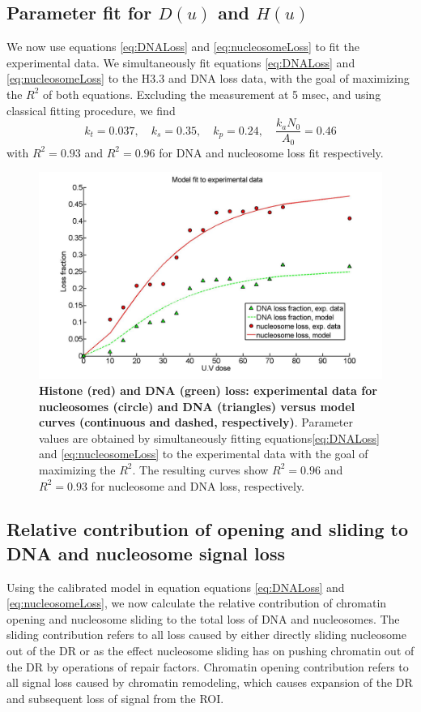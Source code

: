 \documentclass[12pt]{article}
\begin{document}
	\subsection{Parameter fit for $D(u)$ and $H(u)$}\label{subsection:parameterFit}
	We now use equations \eqref{eq:DNALoss}  and \eqref{eq:nucleosomeLoss} to fit the experimental data. We simultaneously fit equations \eqref{eq:DNALoss}  and \eqref{eq:nucleosomeLoss} to the H3.3 and DNA loss data, with the goal of maximizing the $R^2$ of both equations. Excluding the measurement at 5 msec, and using classical fitting procedure, we find
	\begin{equation*}
	k_t = 0.037, \quad k_s = 0.35,\quad k_p = 0.24, \quad \frac{k_aN_0}{A_0} = 0.46
	\end{equation*}
	with $R^2 = 0.93$ and $R^2 = 0.96$ for DNA and nucleosome loss fit respectively.
	
	
\begin{figure}[H]
\centering
\includegraphics[width=0.5\linewidth, height=0.3\textheight]{histoneAndDnaVsUvDoseModelFit}
\caption{\textbf{Histone (red) and DNA (green) loss: experimental data
	for nucleosomes (circle) and DNA (triangles) versus model curves
	(continuous and dashed, respectively)}. Parameter values are obtained
	by simultaneously fitting equations\eqref{eq:DNALoss}  and \eqref{eq:nucleosomeLoss} to the experimental data with
	the goal of maximizing the $R^2$. The resulting curves show $R^2 = 0.96$ and
	$R^2 = 0.93$ for nucleosome and DNA loss, respectively.}
\label{fig:histoneAndDnaVsUvDoseModelFit}
\end{figure}

\subsection{Relative contribution of opening and sliding to DNA
	and nucleosome signal loss}

Using the calibrated model in equation equations \eqref{eq:DNALoss}  and \eqref{eq:nucleosomeLoss}, we now calculate the
relative contribution of chromatin opening and nucleosome sliding to the
total loss of DNA and nucleosomes. The sliding contribution refers to all loss
caused by either directly sliding nucleosome out of the DR or as the effect
nucleosome sliding has on pushing chromatin out of the DR by operations
of repair factors. Chromatin opening contribution refers to all signal loss
caused by chromatin remodeling, which causes expansion of the DR and
subsequent loss of signal from the ROI.
\end{document}
